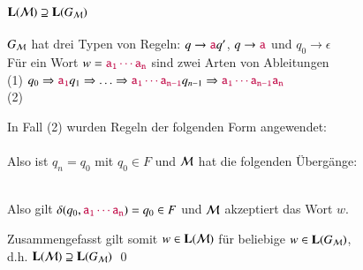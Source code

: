 \documentclass[onlymath]{beamer}
\begin{document}
\begin{frame}[t]\frametitle{$\textbf{\textcolor{black}{L}}(\mathcal{M})\supseteq\textbf{\textcolor{black}{L}}(G_{\mathcal{M}})$}

$G_{\mathcal{M}}$ hat drei Typen von Regeln: $q\to \mathtt{\textcolor{purple}{a}}q'$, $q\to \mathtt{\textcolor{purple}{a}}$ und $q_0\to \epsilon$
\\[1ex]

Für ein Wort $w=\mathtt{\textcolor{purple}{a_1\cdots a_n}}$ sind \alert{zwei} Arten von Ableitungen \\[1ex]

(1) $q_0\Rightarrow \mathtt{\textcolor{purple}{a_1}}q_1 \Rightarrow \ldots \Rightarrow\mathtt{\textcolor{purple}{a_1\cdots a_{n-1}}}q_{n-1}\Rightarrow \mathtt{\textcolor{purple}{a_1\cdots a_{n-1}a_n}}$\\[1ex]
(2) 
\bigskip\pause


In Fall (2) wurden Regeln der folgenden Form angewendet:\\[1ex]
\\[1ex]
Also ist $q_n=q_0$ mit $q_0\in F$ und $\mathcal{M}$ hat die folgenden Übergänge: \\[1ex]
\\[1ex]
\bigskip\pause

Also gilt $\delta(q_0,\mathtt{\textcolor{purple}{a_1\cdots a_n}})=q_0\in F$ und $\mathcal{M}$ akzeptiert das Wort $w$.
\bigskip

Zusammengefasst gilt somit $w\in\textbf{\textcolor{black}{L}}(\mathcal{M})$ für beliebige $w\in\textbf{\textcolor{black}{L}}(G_{\mathcal{M}})$,\\
d.h. $\textbf{\textcolor{black}{L}}(\mathcal{M})\supseteq\textbf{\textcolor{black}{L}}(G_{\mathcal{M}})$
\qed

\end{frame}
\end{document}
